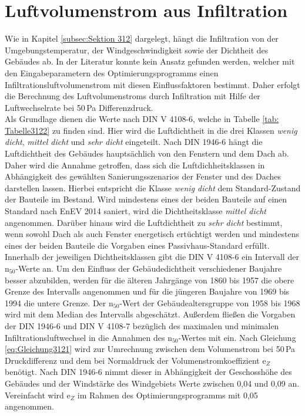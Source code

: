 \section*{Luftvolumenstrom aus Infiltration}

Wie in Kapitel \ref{subsec:Sektion 312} dargelegt, hängt die Infiltration von der Umgebungstemperatur, der Windgeschwindigkeit sowie der Dichtheit des Gebäudes ab.
In der Literatur konnte kein Ansatz gefunden werden, welcher mit den Eingabeparametern des Optimierungsprogramms einen Infiltrationsluftvolumenstrom mit diesen Einflussfaktoren bestimmt.
Daher erfolgt die Berechnung des Luftvolumenstroms durch Infiltration mit Hilfe der Luftwechselrate bei 50\,Pa Differenzdruck.\\
Als Grundlage dienen die Werte nach DIN V 4108-6, welche in Tabelle \ref{tab: Tabelle3122} zu finden sind.
Hier wird die Luftdichtheit in die drei Klassen \textit{wenig dicht}, \textit{mittel dicht} und \textit{sehr dicht} eingeteilt.
Nach DIN 1946-6 hängt die Luftdichtheit des Gebäudes hauptsächlich von den Fenstern und dem Dach ab.
Daher wird die Annahme getroffen, dass sich die Luftdichheitsklassen in Abhängigkeit des gewählten Sanierungsszenarios der Fenster und des Daches darstellen lassen.
Hierbei entspricht die Klasse \textit{wenig dicht} dem Standard-Zustand der Bauteile im Bestand.
Wird mindestens eines der beiden Bauteile auf einen Standard nach EnEV 2014 saniert, wird die Dichtheitsklasse \textit{mittel dicht} angenommen.
Darüber hinaus wird die Luftdichtheit zu \textit{sehr dicht} bestimmt, wenn sowohl Dach als auch Fenster energetisch ertüchtigt werden und mindestens eines der beiden Bauteile die Vorgaben eines Passivhaus-Standard erfüllt.\\
Innerhalb der jeweiligen Dichtheitsklassen gibt die DIN V 4108-6 ein Intervall der n\(_{50}\)-Werte an.
Um den Einfluss der Gebäudedichtheit verschiedener Baujahre besser abzubilden, werden für die älteren Jahrgänge von 1860 bis 1957 die obere Grenze des Intervalls angenommen und für die jüngeren Baujahre von 1969 bis 1994 die untere Grenze. 
Der n\(_{50}\)-Wert der Gebäudealtersgruppe von 1958 bis 1968 wird mit dem Median des Intervalls abgeschätzt.
Außerdem fließen die Vorgaben der DIN 1946-6 und DIN V 4108-7 bezüglich des maximalen und minimalen Infiltrationsluftwechsel in die Annahmen des n\(_{50}\)-Wertes mit ein.
Nach Gleichung \ref{eq:Gleichung3121} wird zur Umrechnung zwischen dem Volumenstrom bei 50\,Pa Druckdifferenz und dem bei Normaldruck der Volumenstromkoeffizient e\(_Z\) benötigt.
Nach DIN 1946-6 nimmt dieser in Abhängigkeit der Geschosshöhe des Gebäudes und der Windstärke des Windgebiets Werte zwischen 0,04 und 0,09 an.
Vereinfacht wird e\(_Z\) im Rahmen des Optimierungsprogramms mit 0,05 angenommen.

